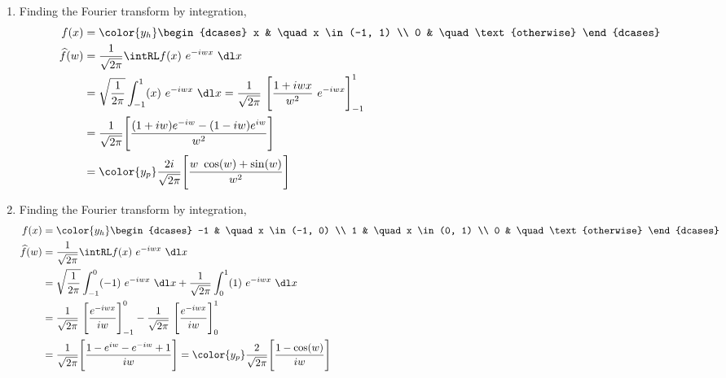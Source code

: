\begin{enumerate}
    \item Finding the Fourier transform by integration,
          \begin{align}
              f(x)           & = \color{y_h}\begin{dcases}
                                                x & \quad x \in (-1, 1)    \\
                                                0 & \quad \text{otherwise}
                                            \end{dcases}              \\
              \widehat{f}(w) & = \frac{1}{\sqrt{2\pi}} \intRL f(x)\ e^{-iwx}\ \dl x \\
                             & = \sqrt{\frac{1}{2\pi}}\int_{-1}^{1} (x)\ e^{-iwx}
              \ \dl x = \frac{1}{\sqrt{2\pi}}\ \Bigg[ \frac{1 + iwx}
              {w^2}\ e^{-iwx} \Bigg]_{-1}^{1}                                       \\
                             & = \frac{1}{\sqrt{2\pi}} \Bigg[ \frac{(1 + iw)e^{-iw}
              - (1-iw)e^{iw}}{w^2} \Bigg]                                           \\
                             & = \color{y_p} \frac{2i}{\sqrt{2\pi}} \Bigg[
                  \frac{w\ \cos(w) + \sin(w)}{w^2} \Bigg]
          \end{align}

    \item Finding the Fourier transform by integration,
          \begin{align}
              f(x)           & = \color{y_h}\begin{dcases}
                                                -1 & \quad x \in (-1, 0)    \\
                                                1  & \quad x \in (0, 1)     \\
                                                0  & \quad \text{otherwise}
                                            \end{dcases}             \\
              \widehat{f}(w) & = \frac{1}{\sqrt{2\pi}} \intRL f(x)\ e^{-iwx}\ \dl x \\
                             & = \sqrt{\frac{1}{2\pi}}\int_{-1}^{0} (-1)\ e^{-iwx}
              \ \dl x + \frac{1}{\sqrt{2\pi}} \int_{0}^{1} (1)\ e^{-iwx}\ \dl x     \\
                             & = \frac{1}{\sqrt{2\pi}}\ \Bigg[ \frac{e^{-iwx}}{iw}
                  \Bigg]_{-1}^{0} - \frac{1}{\sqrt{2\pi}}\ \Bigg[ \frac{e^{-iwx}}{iw}
              \Bigg]_{0}^{1}                                                        \\
                             & = \frac{1}{\sqrt{2\pi}} \Bigg[ \frac{1 - e^{iw}
                      - e^{-iw} + 1}{iw} \Bigg]
              = \color{y_p} \frac{2}{\sqrt{2\pi}} \Bigg[
                  \frac{1 - \cos(w)}{iw} \Bigg]
          \end{align}


\end{enumerate}
